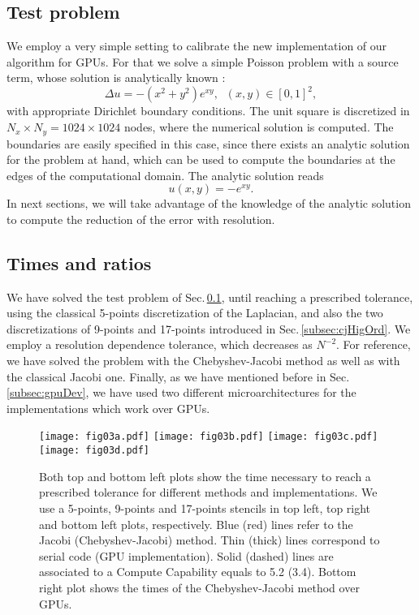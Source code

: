 \documentclass[preprint,12pt]{elsarticle}
\begin{document}
\subsection{Test problem}
\label{subsec:tesPro}

We employ a very simple setting to
  calibrate the new implementation of our algorithm for GPUs. For that
  we solve a simple Poisson problem with a source term, whose solution
  is analytically known \mbox{\cite{Adsuara2017446}}:
%
\begin{equation}
\Delta u = -(x^2 + y^2) e^{x y}, \;\; (x,y)\in[0,1]^2,
\label{eq:Poisson2D}
\end{equation}
%
with appropriate Dirichlet boundary conditions. The unit
  square is discretized in $N_x\times N_y=1024\times 1024$ nodes,
  where the numerical solution is computed. The boundaries are easily
specified in this case, since there exists an analytic solution for
the problem at hand, which can be used to compute the boundaries at
the edges of the computational domain. The analytic solution reads
%
\begin{equation}
u(x,y)=-e^{x y}.
\label{eq:solPoisson2D}
\end{equation}
In next sections, we will take advantage of the knowledge of the analytic solution to compute the reduction of the error with resolution.

\subsection{Times and ratios}
\label{subsec:res}

We have solved the test problem of Sec.\,\ref{subsec:tesPro}, until
reaching a prescribed tolerance, using the classical 5-points
discretization of the Laplacian, and also the two discretizations of
9-points and 17-points introduced in
Sec.\,\ref{subsec:cjHigOrd}. We employ a resolution dependence
  tolerance, which decreases as $N^{-2}$.
For reference, we have solved the problem with the Chebyshev-Jacobi
method as well as with the classical Jacobi one. Finally, as we have
mentioned before in Sec.\,\ref{subsec:gpuDev}, we have used two
different microarchitectures for the implementations which work over
GPUs.

\begin{figure}[h!]
\centering
\texttt{[image: fig03a.pdf]}
\texttt{[image: fig03b.pdf]}
\texttt{[image: fig03c.pdf]} 
\texttt{[image: fig03d.pdf]} 
\caption{Both top and bottom left plots show the time necessary to
  reach a prescribed tolerance for different methods and
  implementations. We use a 5-points, 9-points and 17-points stencils
  in top left, top right and bottom left plots, respectively. Blue
  (red) lines refer to the Jacobi (Chebyshev-Jacobi) method. Thin
  (thick) lines correspond to serial code (GPU implementation). Solid
  (dashed) lines are associated to a Compute Capability equals to 5.2
  (3.4). Bottom right plot shows the times of the Chebyshev-Jacobi
  method over GPUs.}
\label{fig:fig03}
\end{figure}
\end{document}
